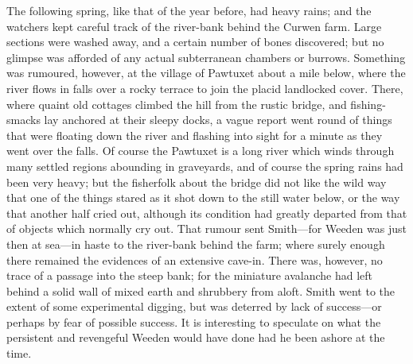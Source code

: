 The following spring, like that of the year before, had heavy rains; and the watchers kept careful track of the river-bank behind the Curwen farm. Large sections were washed away, and a certain number of bones discovered; but no glimpse was afforded of any actual subterranean chambers or burrows. Something was rumoured, however, at the village of Pawtuxet about a mile below, where the river flows in falls over a rocky terrace to join the placid landlocked cover. There, where quaint old cottages climbed the hill from the rustic bridge, and fishing-smacks lay anchored at their sleepy docks, a vague report went round of things that were floating down the river and flashing into sight for a minute as they went over the falls. Of course the Pawtuxet is a long river which winds through many settled regions abounding in graveyards, and of course the spring rains had been very heavy; but the fisherfolk about the bridge did not like the wild way that one of the things stared as it shot down to the still water below, or the way that another half cried out, although its condition had greatly departed from that of objects which normally cry out. That rumour sent Smith—for Weeden was just then at sea—in haste to the river-bank behind the farm; where surely enough there remained the evidences of an extensive cave-in. There was, however, no trace of a passage into the steep bank; for the miniature avalanche had left behind a solid wall of mixed earth and shrubbery from aloft. Smith went to the extent of some experimental digging, but was deterred by lack of success—or perhaps by fear of possible success. It is interesting to speculate on what the persistent and revengeful Weeden would have done had he been ashore at the time.